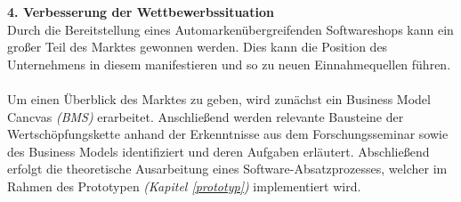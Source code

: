 \textbf{4. Verbesserung der Wettbewerbssituation}\\
Durch die Bereitstellung eines Automarkenübergreifenden Softwareshops kann ein großer Teil des Marktes gewonnen werden. Dies kann die Position des Unternehmens in diesem manifestieren und so zu neuen Einnahmequellen führen.\\\\

Um einen Überblick des Marktes zu geben, wird zunächst ein Business Model Cancvas \textit{(BMS)} erarbeitet. Anschließend werden relevante Bausteine der Wertschöpfungskette anhand der Erkenntnisse aus dem Forschungsseminar sowie des Business Models identifiziert und deren Aufgaben erläutert. Abschließend erfolgt die theoretische Ausarbeitung eines Software-Absatzprozesses, welcher im Rahmen des Prototypen \textit{(Kapitel \ref{prototyp})} implementiert wird. 